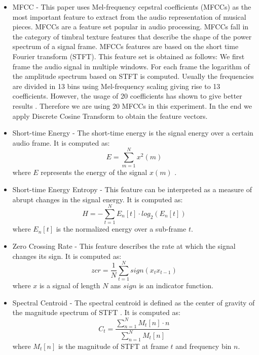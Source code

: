 \documentclass[a4paper,11pt,oneside]{article}
\begin{document}
\begin{itemize}
  \item MFCC - 
  This paper uses Mel-frequency cepstral coefficients (MFCCs) as the most important feature to extract from the audio representation 
  of musical pieces. MFCCs are a feature set popular in audio processing. MFCCs fall in the category of timbral 
  texture features that describe the shape of the power spectrum of a signal frame. MFCCs features are based on the 
  short time Fourier transform (STFT). This feature set is obtained as follows: We first frame the audio signal in 
  multiple windows. For each frame the logarithm of the amplitude spectrum based on STFT is computed. Usually the 
  frequencies are divided in 13 bins using Mel-frequency scaling giving rise to 13 coefficients. 
  However, the usage of 20 coefficients has shown to give better results \cite{ellis}. Therefore we are using 20 
  MFCCs in this experiment. In the end we apply Discrete Cosine Transform to obtain the feature vectors. 
  \item Short-time Energy - The short-time energy is the signal energy over a certain audio frame. It is computed as:
  \begin{equation} 
    E = \sum_{m=1}^{N} x^2(m)
  \end{equation} where $E$ represents the energy of the signal $x(m)$ \cite{jalil2013short}.
  \item Short-time Energy Entropy - This feature can be interpreted as a measure of abrupt changes in the signal energy.
  It is computed as:
  \begin{equation}
    H = - \sum_{t=1}^N E_n[t]\cdot log_2(E_n[t])
  \end{equation} where $E_n[t]$ is the normalized energy over a sub-frame $t$.
  \item Zero Crossing Rate - This feature describes the rate at which the signal changes its sign. It is computed as:
  \begin{equation}
    zcr = \frac{1}{N}\sum_{t=1}^{N} sign(x_t x_{t-1})
  \end{equation} where $x$ is a signal of length $N$ ans $sign$ is an indicator function.
  \item Spectral Centroid - The spectral centroid is defined as the center of gravity of the magnitude spectrum of
  STFT \cite{tzan}. It is computed as:
  \begin{equation} \label{eq:3}
    C_t = \frac{\sum_{n=1}^N M_t[n]\cdot n}{\sum_{n=1}^N M_t[n]}
  \end{equation} where $M_t[n]$ is the magnitude of STFT at frame $t$ and frequency bin $n$.

\end{itemize}
\end{document}
